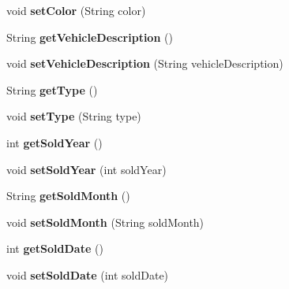 \begin{DoxyCompactItemize}
void {\bfseries set\+Color} (String color)
\item 
\mbox{\label{classobjects_1_1_sold_vehicle_a60f8cbc810049c341a2b7ceeabd23668}} 
String {\bfseries get\+Vehicle\+Description} ()
\item 
\mbox{\label{classobjects_1_1_sold_vehicle_a9eee0ce0ad438f2f8231ecf90a8fde60}} 
void {\bfseries set\+Vehicle\+Description} (String vehicle\+Description)
\item 
\mbox{\label{classobjects_1_1_sold_vehicle_a04cbf9a5900cabe0007c913d5432df6a}} 
String {\bfseries get\+Type} ()
\item 
\mbox{\label{classobjects_1_1_sold_vehicle_a0a7b7b0c4a02c4d1752acc8e7d99a754}} 
void {\bfseries set\+Type} (String type)
\item 
\mbox{\label{classobjects_1_1_sold_vehicle_ab8f72519bede13f76e345c7045675388}} 
int {\bfseries get\+Sold\+Year} ()
\item 
\mbox{\label{classobjects_1_1_sold_vehicle_aa6a2abe28a2e877deb40e073e1d31db0}} 
void {\bfseries set\+Sold\+Year} (int sold\+Year)
\item 
\mbox{\label{classobjects_1_1_sold_vehicle_a2c9350317475be185832d11cccfd3851}} 
String {\bfseries get\+Sold\+Month} ()
\item 
\mbox{\label{classobjects_1_1_sold_vehicle_a28b078b6bcbbf1172ae6ce42d00e2743}} 
void {\bfseries set\+Sold\+Month} (String sold\+Month)
\item 
\mbox{\label{classobjects_1_1_sold_vehicle_ac75a11577734c042f4756fef2358c9d4}} 
int {\bfseries get\+Sold\+Date} ()
\item 
\mbox{\label{classobjects_1_1_sold_vehicle_ad248f99e78728b2ee7ff2d8d8b9acf31}} 
void {\bfseries set\+Sold\+Date} (int sold\+Date)
\item 
\mbox{\label{classobjects_1_1_sold_vehicle_afd0d31459103250a6618f6d6d1adfc26}} 

\end{DoxyCompactItemize}
